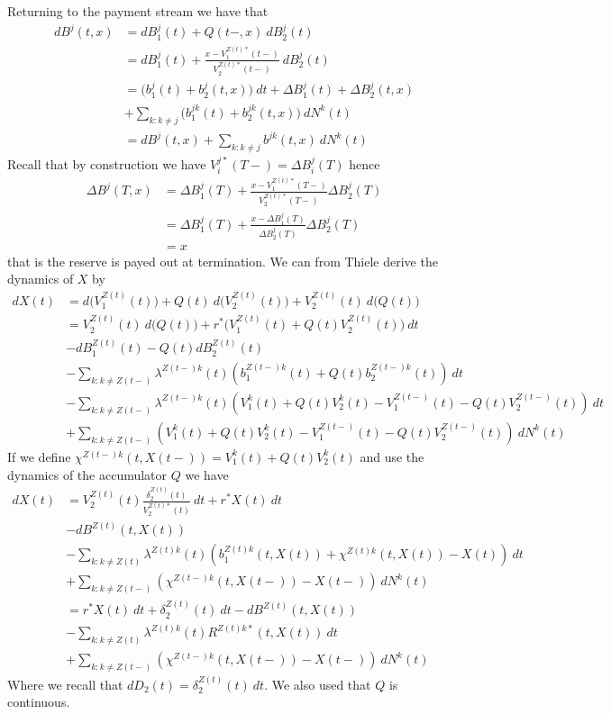\documentclass[a4paper,12pt,openany]{book}
\begin{document}
Returning to the payment stream we have that
\begin{align*}
dB^j(t,x)&=dB_1^j(t)+Q(t-,x)\ dB_2^j(t)\\
&=dB_1^j(t)+\frac{x-V_1^{Z(t)*}(t-)}{V_2^{Z(t)*}(t-)}\ dB_2^j(t)\\
&=\Big(b_1^j(t)+b_2^j(t,x)\Big)\ dt+\Delta B_1^j(t)+\Delta B^j_2(t,x)\\
&+\sum_{k:k\ne j}\Big(b_1^{jk}(t)+b_2^{jk}(t,x)\Big)\ dN^k(t)\\
&=dB^{j}(t,x)+\sum_{k:k\ne j}b^{jk}(t,x)\ dN^k(t)
\end{align*}
Recall that by construction we have \(V_i^{j*}(T-)=\Delta B_i^j(T)\) hence
\begin{align*}
\Delta B^j(T,x)&=\Delta B_1^j(T)+\frac{x-V_1^{Z(t)*}(T-)}{V_2^{Z(t)*}(T-)}\Delta B^j_2(T)\\
&=\Delta B_1^j(T)+\frac{x-\Delta B_1^j(T)}{\Delta B_2^j(T)}\Delta B^j_2(T)\\
&=x
\end{align*}
that is the reserve is payed out at termination. We can from Thiele derive the dynamics of \(X\) by
\begin{align*}
dX(t)&=d\Big(V_1^{Z(t)}(t)\Big)+Q(t)\ d\Big(V_2^{Z(t)}(t)\Big)+V_2^{Z(t)}(t)\ d\Big(Q(t)\Big)\\
&=V_2^{Z(t)}(t)\ d\Big(Q(t)\Big)+r^*\Big(V_1^{Z(t)}(t)+Q(t)V_2^{Z(t)}(t)\Big)\ dt\\
&-dB^{Z(t)}_1(t)-Q(t)dB^{Z(t)}_2(t)\\
&-\sum_{k:k\ne Z(t-)}\lambda^{Z(t-)k}(t)\left(b^{Z(t-)k}_1(t)+Q(t)b^{Z(t-)k}_2(t)\right)\ dt\\
&-\sum_{k:k\ne Z(t-)}\lambda^{Z(t-)k}(t)\left(V^{k}_1(t)+Q(t)V^{k}_2(t)-V^{Z(t-)}_1(t)-Q(t)V^{Z(t-)}_2(t)\right)\ dt\\
&+\sum_{k:k\ne Z(t-)}\left(V^{k}_1(t)+Q(t)V^{k}_2(t)-V^{Z(t-)}_1(t)-Q(t)V^{Z(t-)}_2(t)\right)\ dN^k(t)
\end{align*}
If we define \(\chi^{Z(t-)k}(t,X(t-))=V^{k}_1(t)+Q(t)V^{k}_2(t)\) and use the dynamics of the accumulator \(Q\) we have
\begin{align*}
dX(t)&=V_2^{Z(t)}(t)\frac{\delta_2^{Z(t)}(t)}{V_2^{Z(t)*}(t)}\ dt+r^*X(t)\ dt\\
&-dB^{Z(t)}(t,X(t))\\
&-\sum_{k:k\ne Z(t)}\lambda^{Z(t)k}(t)\left(b^{Z(t)k}_1(t,X(t))+\chi^{Z(t)k}(t,X(t))-X(t)\right)\ dt\\
&+\sum_{k:k\ne Z(t-)}\left(\chi^{Z(t-)k}(t,X(t-))-X(t-)\right)\ dN^k(t)\\
&=r^*X(t)\ dt+\delta_2^{Z(t)}(t)\ dt-dB^{Z(t)}(t,X(t))\\
&-\sum_{k:k\ne Z(t)}\lambda^{Z(t)k}(t)R^{Z(t)k*}(t,X(t))\ dt\\
&+\sum_{k:k\ne Z(t-)}\left(\chi^{Z(t-)k}(t,X(t-))-X(t-)\right)\ dN^k(t)
\end{align*}
Where we recall that \(dD_2(t)=\delta_2^{Z(t)}(t)\ dt\). We also used that \(Q\) is continuous.
\end{document}
